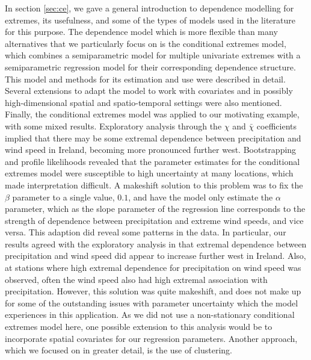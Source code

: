 \documentclass{article}
\numberwithin{equation}{section}
\begin{document}
In section \ref{sec:ce}, we gave a general introduction to dependence modelling for extremes, its usefulness, and some of the types of models used in the literature for this purpose. 
The dependence model which is more flexible than many alternatives that we particularly focus on is the conditional extremes model, which combines a semiparametric model for multiple univariate extremes with a semiparametric regression model for their corresponding dependence structure.
This model and methods for its estimation and use were described in detail. 
Several extensions to adapt the model to work with covariates and in possibly high-dimensional spatial and spatio-temporal settings were also mentioned. 
Finally, the conditional extremes model was applied to our motivating example, with some mixed results. 
Exploratory analysis through the $\chi$ and $\bar{\chi}$ coefficients implied that there may be some extremal dependence between precipitation and wind speed in Ireland, becoming more pronounced further west.
Bootstrapping and profile likelihoods revealed that the parameter estimates for the conditional extremes model were susceptible to high uncertainty at many locations, which made interpretation difficult. 
A makeshift solution to this problem was to fix the $\beta$ parameter to a single value, $0.1$, and have the model only estimate the $\alpha$ parameter, which as the slope parameter of the regression line corresponds to the strength of dependence between precipitation and extreme wind speeds, and vice versa.
This adaption did reveal some patterns in the data.
In particular, our results agreed with the exploratory analysis in that extremal dependence between precipitation and wind speed did appear to increase further west in Ireland. 
Also, at stations where high extremal dependence for precipitation on wind speed was observed, often the wind speed also had high extremal association with precipitation. 
However, this solution was quite makeshift, and does not make up for some of the outstanding issues with parameter uncertainty which the model experiences in this application. 
As we did not use a non-stationary conditional extremes model here, one possible extension to this analysis would be to incorporate spatial covariates for our regression parameters. 
Another approach, which we focused on in greater detail, is the use of clustering.
\end{document}
